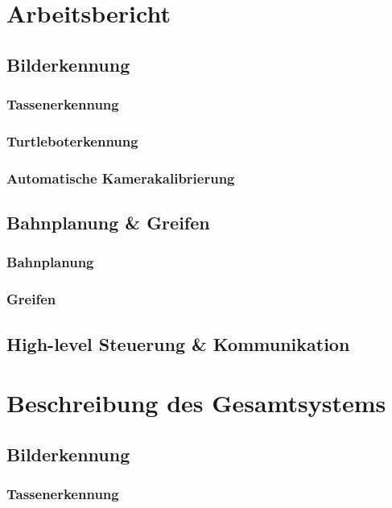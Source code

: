 \documentclass[de,ids]{fziartcl}
\begin{document}
\section{Arbeitsbericht}
\subsection{Bilderkennung}
\subsubsection{Tassenerkennung}

\subsubsection{Turtleboterkennung}

\subsubsection{Automatische Kamerakalibrierung}


\subsection{Bahnplanung \& Greifen}
\subsubsection{Bahnplanung}

\subsubsection{Greifen}


\subsection{High-level Steuerung \& Kommunikation}


\section{Beschreibung des Gesamtsystems}
\subsection{Bilderkennung}
\subsubsection{Tassenerkennung}

\end{document}
